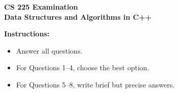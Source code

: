 \documentclass[11pt]{article}
\begin{document}
\begin{center}
  {\Large \textbf{CS 225 Examination}}\\[0.25em]
  {\large \textbf{Data Structures and Algorithms in C++}}\\[0.5em]
\end{center}

\noindent\textbf{Instructions:}
\begin{itemize}
  \item Answer all questions.
  \item For Questions 1--4, choose the best option.
  \item For Questions 5--8, write brief but precise answers.
\end{itemize}

\vspace{0.5em}
\end{document}
